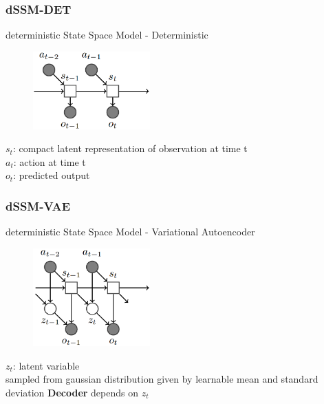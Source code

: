 \begin{frame}
	\frametitle{dSSM-DET}
	\vspace{-10mm}
	deterministic State Space Model - Deterministic
	\begin{multicols}{2}
		\begin{figure}[h]
			\includegraphics[width=0.4\textwidth]{./latent_i2a_images/dSSM_DET_architecture.png}	
		\end{figure}
		\columnbreak
		$s_t$: compact latent representation of observation at time t\\
		$a_t$: action at time t\\
		$o_t$: predicted output
	\end{multicols}
%	
\end{frame}

\begin{frame}
	\frametitle{dSSM-VAE}
	\vspace{-10mm}
	deterministic State Space Model - Variational Autoencoder
	\begin{multicols}{2}
		\begin{figure}[h]
			\includegraphics[width=0.4\textwidth]{./latent_i2a_images/dSSM_VAE_architecture.png}	
		\end{figure}
		\columnbreak
		$z_t$: latent variable\\
		 sampled from gaussian distribution given by learnable mean and standard deviation
		\textbf{Decoder} depends on $z_t$
	\end{multicols}
\end{frame}


